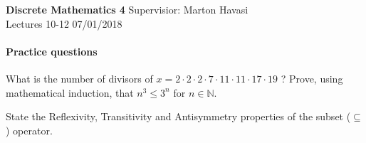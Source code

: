 \documentclass{exam}
\begin{document}
\noindent
\large\textbf{Discrete Mathematics 4} \hfill Supervisior: Marton Havasi \\
\normalsize Lectures 10-12 \hfill 07/01/2018

\paragraph{Practice questions}
\begin{questions}
\question What is the number of divisors of $x=2\cdot 2\cdot 2\cdot 7\cdot 11\cdot 11 \cdot 17 \cdot 19$ ?
\question Prove, using mathematical induction, that $n^3 \le 3^n$ for $n \in \mathds{N}$.

\question State the Reflexivity, Transitivity and Antisymmetry properties of the subset ($\subseteq$) operator.
\end{questions}
\end{document}
